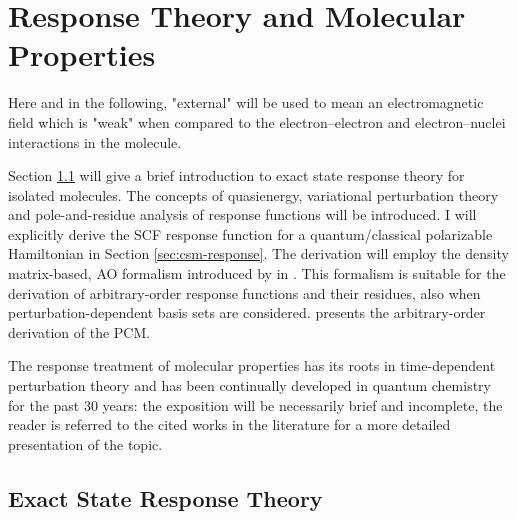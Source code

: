 \chapter{Response Theory and Molecular Properties}\label{ch:molprop}

\begin{epigraphs}
\end{epigraphs}

Here and in the following, "external" will be used to mean an
electromagnetic field which is "weak" when compared to the
electron--electron and electron--nuclei interactions in the molecule.

Section \ref{sec:exact-response} will give a brief introduction to exact
state response theory for isolated molecules. The concepts of
quasienergy,\autocite{Christiansen1998-pe} variational perturbation
theory\autocite{Helgaker1992-ph} and pole-and-residue
analysis of response functions\autocite{Olsen1985-nr} will be introduced.
I will explicitly derive the \acrshort{SCF} response function for a
quantum/classical polarizable Hamiltonian in Section
\ref{sec:csm-response}. The derivation will employ the
density matrix-based, \acrshort{AO} formalism introduced by
\citeauthor{Thorvaldsen2008-sg} in .
This formalism is suitable for the derivation of arbitrary-order
response functions and their residues, also when perturbation-dependent
basis sets are considered.\autocite{Friese2015-kb, Friese2015-bu}
 presents the arbitrary-order derivation of the \acrshort{PCM}.

The response treatment of molecular properties has its roots in
time-dependent perturbation theory\autocite{Konishi2009-zb} and has been
continually developed in quantum chemistry for the past 30 years:
the exposition will be necessarily brief and incomplete, the reader is
referred to the cited works in the literature for a more detailed
presentation of the topic.\autocite{Olsen1985-nr, Helgaker1992-ph, Olsen1995-pf,
Christiansen1998-pe, Norman2011-ad, Helgaker2012-cz, Pawlowski2015-sq}

\section{Exact State Response Theory}\label{sec:exact-response}

